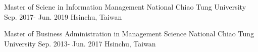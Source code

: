 

\begin{cventries}

  \cventry
    {Master of Sciene in Information Management} %
    {National Chiao Tung University} %
    {Sep. 2017- Jun. 2019} %
    {Hsinchu, Taiwan} %
    {
    }

    \vspace{-1em}
  \cventry
    {Master of Business Administration in Management Science} %
    {National Chiao Tung University} %
    {Sep. 2013- Jun. 2017} %
    {Hsinchu, Taiwan} %
    {
    }

\end{cventries}